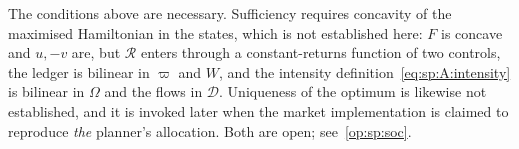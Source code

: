 \begin{remark}\label{rem:sp:A:soc}
The conditions above are necessary. Sufficiency requires concavity of the maximised Hamiltonian in the
states, which is not established here: $F$ is concave and $u,-v$ are, but $\mathcal R$ enters through a
constant-returns function of two controls, the ledger is bilinear in $\varpi$ and $W$, and the intensity
definition~\eqref{eq:sp:A:intensity} is bilinear in $\Omega$ and the flows in $\mathcal D$. Uniqueness of
the optimum is likewise not established, and it is invoked later when the market implementation is
claimed to reproduce \emph{the} planner's allocation. Both are open; see~\ref{op:sp:soc}.
\end{remark}
